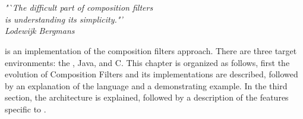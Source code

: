 \chapter{\Compose*{}}
\begin{flushright}
\textit{"`The difficult part of composition filters}\\
\textit{is understanding its simplicity."'}\\
\textit{Lodewijk Bergmans}\\
\end{flushright}

\label{chp:ComposeStar}

\Compose* is an implementation of the composition filters approach. There are three target environments: the \dotNET, Java, and C.
This chapter is organized as follows, first the evolution of Composition Filters and its implementations are described, followed by an explanation of the \Compose* language and a demonstrating example. 
In the third section, the \Compose* architecture is explained, followed by a description of the features specific to \Compose*.












